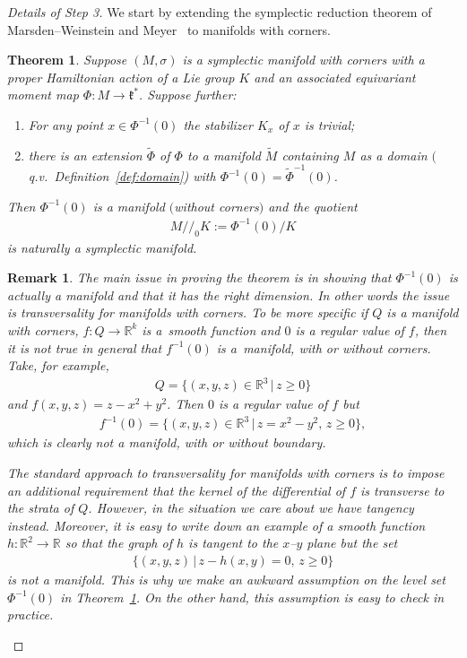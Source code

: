 \documentclass[10pt,a4paper]{amsart}
\numberwithin{equation}{section}
\newtheorem{Theorem}[Lemma]{Theorem}
\newtheorem{Remark}[Lemma]{Remark}
\begin{document}
\begin{proof}[Details of Step 3]
  We start by extending the symplectic reduction theorem of
  Marsden--Wein\-stein and Meyer~\cite{MW, Meyer} to manifolds with corners.

\begin{Theorem}\label{thm:red-corner}
  Suppose $(M,\sigma)$ is a symplectic manifold with corners with a proper
  Hamiltonian action of a Lie group $K$ and an associated equivariant
  moment map $\Phi\colon M\to{\mathfrak k}^*$.  Suppose further:
\begin{enumerate}[$1.$]\itemsep=0pt
\item For any point $x\in \Phi^{-1} (0)$ the stabilizer $K_x$ of $x$ is trivial;
\item there is an extension $\tilde{\Phi}$ of $\Phi$ to a manifold
  $\tilde{M}$ containing $M$ as a domain $($q.v.\
  Definition~{\rm \ref{def:domain})} with $\Phi^{-1} (0) = \tilde{\Phi}^{-1}
  (0)$.
\end{enumerate}
Then $\Phi^{-1} (0)$ is a manifold $($without corners$)$ and the quotient
\begin{gather*}
M/\!/_0 K:= \Phi^{-1} (0)/K
\end{gather*}
is naturally a symplectic manifold.
\end{Theorem}
\begin{Remark}
  The main issue in proving the theorem is in showing that $\Phi^{-1}
  (0)$ is actually a manifold and that it has the right dimension.  In
  other words the issue is transversality for manifolds with corners.
  To be more specif\/ic if $Q$ is a manifold with corners, $f\colon Q\to {\mathbb R}^k$
  is a~smooth function and $0$ is a regular value of $f$, then it is
  not true in general that $f^{-1} (0)$ is a~manifold, with or without
  corners. Take, for example,
\begin{gather*}
Q =\big\{(x,y,z)\in {\mathbb R}^3 \,|\, z\geq 0\big\}
\end{gather*}
and $f(x,y,z) = z-x^2 + y^2$.  Then $0$ is a regular value of $f$ but{\samepage
\begin{gather*}
f^{-1} (0) = \big\{(x,y,z)\in {\mathbb R}^3 \,|\,  z= x^2 -y^2,\,  z\geq 0\big\},
\end{gather*}
which is clearly not a manifold, with or without boundary.}

The standard approach to transversality for manifolds with
corners \cite{Nielsen} is to impose an additional requirement that the
kernel of the dif\/ferential of $f$ is transverse to the strata of $Q$.
However, in the situation we care about we have tangency instead.
Moreover, it is easy to write down an example of a smooth function
$h\colon {\mathbb R}^2\to {\mathbb R}$ so that the graph of $h$ is tangent to the $x$--$y$ plane
but the set
\begin{gather*}
\{(x,y,z)\,|\, z-h(x,y)=0,\, z\geq 0\}
\end{gather*}
is not a manifold.  This is why we make an awkward assumption on the
level set $\Phi^{-1} (0)$ in Theorem~\ref{thm:red-corner}.  On the other
hand, this assumption is easy to check in practice.
\end{Remark}


\end{proof}
\end{document}
